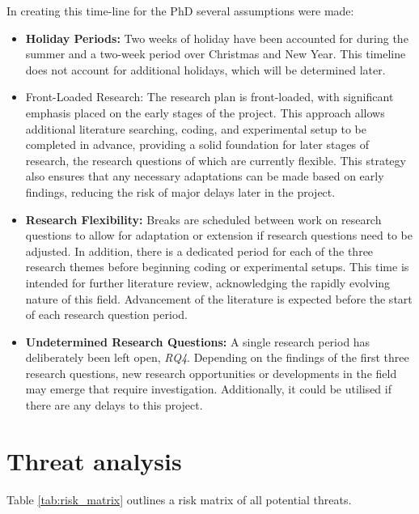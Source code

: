 \documentclass[10pt,oneside]{book}
\begin{document}
In creating this time-line for the PhD several assumptions were made:
\begin{itemize}
    \item \textbf{Holiday Periods:} Two weeks of holiday have been accounted for during the summer and a two-week period over Christmas and New Year. This timeline does not account for additional holidays, which will be determined later.
    \item Front-Loaded Research: The research plan is front-loaded, with significant emphasis placed on the early stages of the project. This approach allows additional literature searching, coding, and experimental setup to be completed in advance, providing a solid foundation for later stages of research, the research questions of which are currently flexible. This strategy also ensures that any necessary adaptations can be made based on early findings, reducing the risk of major delays later in the project. 
    \item \textbf{Research Flexibility:} Breaks are scheduled between work on research questions to allow for adaptation or extension if research questions need to be adjusted. In addition, there is a dedicated period for each of the three research themes before beginning coding or experimental setups. This time is intended for further literature review, acknowledging the rapidly evolving nature of this field. Advancement of the literature is expected before the start of each research question period.
    \item \textbf{Undetermined Research Questions:} A single research period has deliberately been left open, \emph{RQ4}. Depending on the findings of the first three research questions, new research opportunities or developments in the field may emerge that require investigation. Additionally, it could be utilised if there are any delays to this project. 
\end{itemize}

\section{Threat analysis}

Table \ref{tab:risk_matrix} outlines a risk matrix of all potential threats.
\end{document}

